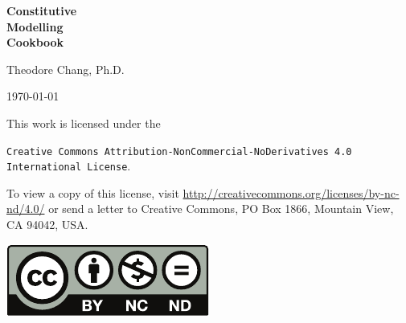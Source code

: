 \begin{titlepage}
\vspace*{\fill}
\begin{flushleft}\begin{spacing}{2}\Huge
\textbf{Constitutive\\\hspace*{2cm}Modelling\\\hspace*{4cm}Cookbook}
\end{spacing}\end{flushleft}
\vspace*{4cm}
\begin{flushright}\LARGE
Theodore Chang, Ph.D.\end{flushright}
\vspace*{2cm}
\begin{center}
\today
\end{center}
\vspace*{\fill}
\end{titlepage}
\clearpage
\vspace*{\fill}
This work is licensed under the
\begin{center}\texttt{Creative Commons Attribution-NonCommercial-NoDerivatives 4.0 International License}.
\end{center}
To view a copy of this license, visit \url{http://creativecommons.org/licenses/by-nc-nd/4.0/} or send a letter to Creative Commons, PO Box 1866, Mountain View, CA 94042, USA.
\begin{center}
\includegraphics{PIC/MISC/by-nc-nd}
\end{center}
\clearpage